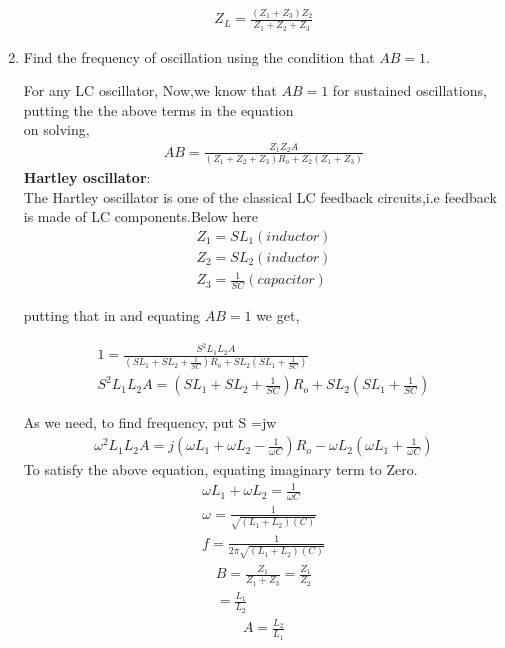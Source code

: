 \begin{enumerate}[label=\thesection.\arabic*.,ref=\thesection.\theenumi]
\begin{align}    
    Z_L = \frac{(Z_1 + Z_3)Z_2}{Z_1+Z_2+Z_3}
\end{align}


\item Find the frequency of oscillation using the condition that $AB = 1$.

\solution For any LC oscillator, 
Now,we know that $AB = 1$ for sustained oscillations, putting the the above terms in the equation\\
on solving,\\
\begin{align}    
    AB = \frac{Z_1Z_2A}{(Z_1+Z_2+Z_3)R_o+ Z_2(Z_1+Z_3)}
\end{align}    
\textbf{Hartley oscillator}:\\
The Hartley oscillator is one of the classical LC feedback circuits,i.e feedback is made of LC components.Below here 
\begin{align}
    Z_1 = SL_1 (inductor)\\
    Z_2 = SL_2 (inductor)\\
    Z_3 = \frac{1}{SC} (capacitor)
\end{align}

putting that in and equating $AB=1$ we get,

\begin{align}
1 = \frac{S^{2}L_1L_2A}{(SL_1+SL_2+\frac{1}{SC})R_o+ SL_2(SL_1+\frac{1}{SC})}\\
S^{2}L_1L_2A = (SL_1+SL_2+\frac{1}{SC})R_o+ SL_2(SL_1+\frac{1}{SC})
\end{align}

As we need, to find frequency, put S =jw
\begin{align}
    \omega^{2}L_1L_2A = j(\omega L_1 + \omega L_2 -\frac{1}{\omega C})R_o -\omega L_2(\omega L_1 + \frac{1}{\omega C})
\end{align}
To satisfy the above equation, equating imaginary term to Zero.
\begin{align}    
    \omega L_1 + \omega L_2  = \frac{1}{\omega C}\\
    \omega = \frac{1}{\sqrt{(L_1+L_2)(C)}}\\
    f = \frac{1}{2\pi \sqrt{(L_1+L_2)(C)}}
\end{align}
\begin{align}
    B = \frac{Z_1}{Z_1 + Z_3} = \frac{Z_1}{Z_2}\\
      = \frac{L_1}{L_2}
    \label{eq:ee18btech11019_B_gain}  
\end{align}
\begin{align}
    A =  \frac{L_2}{L_1} 
\label{eq:ee18btech11019_Amp_gain}
\end{align}
 

\end{enumerate}
